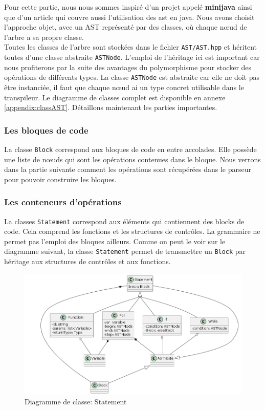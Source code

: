 \documentclass[a4paper]{article}%
\begin{document}
Pour cette partie, nous nous sommes inspiré d'un projet appelé \textbf{minijava}
\cite{minijava} ainsi que d'un article \cite{gagnon1998sablecc} qui couvre aussi
l'utilisation des \gls{ast} en java. Nous avons choisit l'approche objet, avec un AST
représenté par des classes, où chaque nœud de l'arbre a sa propre classe.\\

Toutes les classes de l'arbre sont stockées dans le fichier
\lstinline{AST/AST.hpp} et héritent toutes d'une classe abstraite
\lstinline{ASTNode}. L'emploi de l'héritage ici est important car
nous profiterons par la suite des avantages du polymorphisme pour stocker des
opérations de différents types. La classe \lstinline{ASTNode} est abstraite car
elle ne doit pas être instanciée, il faut que chaque nœud ai un type concret
utilisable dans le transpileur. Le diagramme de classes complet est disponible
en annexe \ref{appendix:classAST}. Détaillons maintenant les parties
importantes.

\subsubsection*{Les bloques de code}

La classe \lstinline{Block} correspond aux bloques de code en entre accolades.
Elle possède une liste de nœuds qui sont les opérations contenues dans le
bloque. Nous verrons dans la partie suivante comment les opérations sont
récupérées dans le parseur pour pouvoir construire les bloques.

\clearpage{}
\subsubsection*{Les conteneurs d'opérations}

La classes \lstinline{Statement} correspond aux éléments qui contiennent des
blocks de code. Cela comprend les fonctions et les structures de contrôles. La
grammaire ne permet pas l'emploi des bloques ailleurs. Comme on peut le voir sur
le diagramme suivant, la classe \lstinline{Statement} permet de transmettre un
\lstinline{Block} par héritage aux structures de contrôles et aux fonctions.

\begin{figure}[h!]
  \begin{center}
  \includegraphics[scale=0.5]{../ressources/diagrams/stmts.png}
  \caption{Diagramme de classe: Statement}
  \end{center}
\end{figure}
\end{document}
